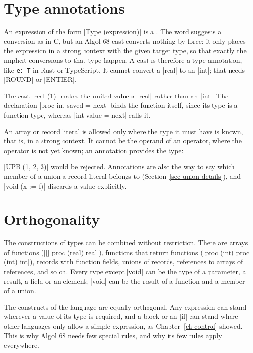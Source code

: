 \section{Type annotations}\label{sec-casts}

An expression of the form \code|Type (expression)| is a . The
word suggests a conversion as in C, but an Algol 68 cast converts nothing
by force: it only places the expression in a strong context with the
given target type, so that exactly the implicit conversions to that type
happen. A cast is therefore a type annotation, like \texttt{e: T} in
Rust or TypeScript. It cannot convert a \code|real| to an \code|int|; that
needs \code|ROUND| or \code|ENTIER|.


The cast \code|real (1)| makes the united value a \code|real| rather than
an \code|int|. The declaration \code|proc int saved = next| binds the
function itself, since its type is a function type, whereas
\code|int value = next| calls it.

An array or record literal is allowed only where the type it must have
is known, that is, in a strong context. It cannot be the operand of an
operator, where the operator is not yet known; an annotation provides the
type:


\code|UPB (1, 2, 3)| would be rejected. Annotations are also the way to
say which member of a union a record literal belongs to
(Section~\ref{sec-union-details}), and \code|void (x := f)| discards a
value explicitly.

\section{Orthogonality}\label{sec-orthogonality}

The constructions of types can be combined without restriction. There
are arrays of functions (\code|[] proc (real) real|), functions that
return functions (\code|proc (int) proc (int) int|), records with
function fields, unions of records, references to arrays of references,
and so on. Every type except \code|void| can be the type of a parameter,
a result, a field or an element; \code|void| can be the result of a
function and a member of a union.

The constructs of the language are equally orthogonal. Any expression
can stand wherever a value of its type is required, and a block or an
\code|if| can stand where other languages only allow a simple
expression, as Chapter~\ref{ch-control} showed. This is why Algol 68 needs few special
rules, and why its few rules apply everywhere.

